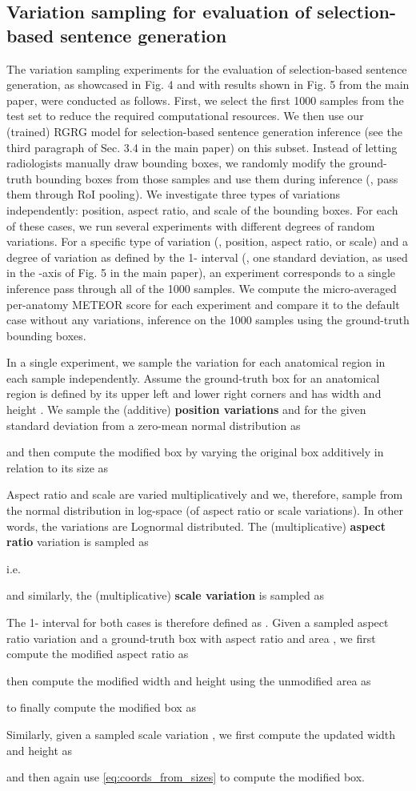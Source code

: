 \documentclass[10pt,twocolumn,letterpaper]{article}
\begin{document}
\subsection{Variation sampling for evaluation of selection-based sentence generation}\label{appendix:variation_sampling}
The variation sampling experiments for the evaluation of selection-based sentence generation, as showcased in Fig. 4 and with results shown in Fig. 5 from the main paper, were conducted as follows.
First, we select the first 1000 samples from the test set to reduce the required computational resources. We then use our (trained) RGRG model for selection-based sentence generation inference (see the third paragraph of Sec. 3.4 in the main paper) on this subset. Instead of letting radiologists manually draw bounding boxes, we randomly modify the ground-truth bounding boxes from those samples and use them during inference (\ie, pass them through RoI pooling). We investigate three types of variations independently: position, aspect ratio, and scale of the bounding boxes. For each of these cases, we run several experiments with different degrees of random variations.
For a specific type of variation (\ie, position, aspect ratio, or scale) and a degree of variation as defined by the 1- interval (\ie, one standard deviation, as used in the -axis of Fig. 5 in the main paper), an experiment corresponds to a single inference pass through all of the 1000 samples.
 We compute the micro-averaged per-anatomy METEOR score for each experiment and compare it to the default case without any variations, \ie inference on the 1000 samples using the ground-truth bounding boxes.

In a single experiment, we sample the variation for each anatomical region in each sample independently.
Assume the ground-truth box for an anatomical region is defined by its upper left  and lower right  corners and has width  and height . 
We sample the (additive) \textbf{position variations}  and  for the given standard deviation  from a zero-mean normal distribution  as

and then compute the modified box  by varying the original box additively in relation to its size as


Aspect ratio and scale are varied multiplicatively and we, therefore, sample from the normal distribution in log-space (of aspect ratio or scale variations). In other words, the variations are Lognormal distributed. The (multiplicative) \textbf{aspect ratio} variation  is sampled as

i.e.\

and similarly, the (multiplicative) \textbf{scale variation}  is sampled as

The 1- interval for both cases is therefore defined as .
Given a sampled aspect ratio variation  and a ground-truth box  with aspect ratio  and area , we first compute the modified aspect ratio  as

then compute the modified width  and height  using the unmodified area  as

to finally compute the modified box as

Similarly, given a sampled scale variation , we first compute the updated width and height  as

and then again use \eqref{eq:coords_from_sizes} to compute the modified box.
 
\end{document}

